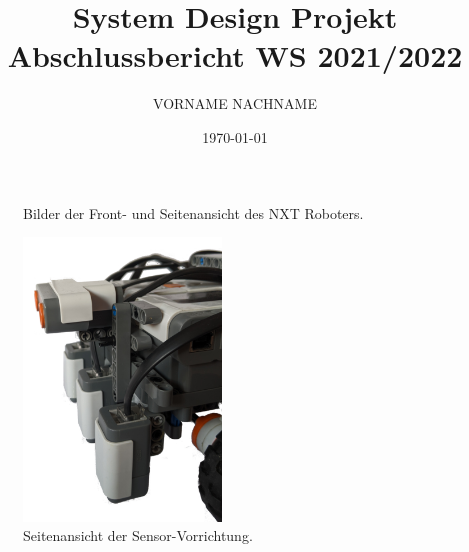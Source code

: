 \documentclass[12pt]{article}
\title{
  \vspace{2cm}
  \Huge System Design Projekt \\[0.2cm]
  \LARGE Abschlussbericht WS 2021/2022
}
\author{\Large VORNAME NACHNAME}
\date{ \today }
\begin{document}
\maketitle  %
\vspace{0.25cm}



\quad %
\vspace{2cm}

\begin{figure}[H]
  \centering
  \caption{Bilder der Front- und Seitenansicht des NXT Roboters.}
  \label{Figure:RobotPics}  %
\end{figure}

\begin{figure}[H]
  \centering
  \includegraphics[width=0.47\textwidth]{Sensors.png}
  \caption{Seitenansicht der Sensor-Vorrichtung.}
  \label{Figure:Sensors}
\end{figure}

\quad




\end{document}
